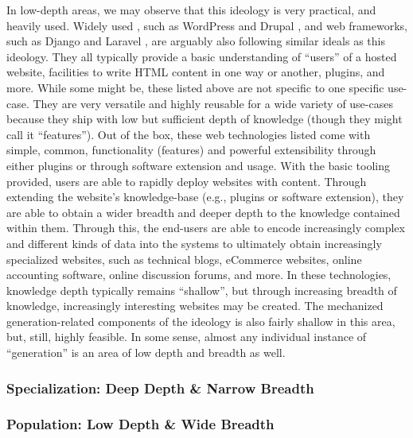 In low-depth areas, we may observe that this ideology is very practical, and
heavily used. Widely used , such as WordPress \cite{WordPress} and
Drupal \cite{Drupal}, and web frameworks, such as Django \cite{Django} and
Laravel \cite{Laravel}, are arguably also following similar ideals as this
ideology. They all typically provide a basic understanding of ``users'' of a
hosted website, facilities to write HTML content in one way or another, plugins,
and more. While some might be, these listed above are not specific to one
specific use-case. They are very versatile and highly reusable for a wide
variety of use-cases because they ship with low but sufficient depth of
knowledge (though they might call it ``features''). Out of the box, these web
technologies listed come with simple, common, functionality (features) and
powerful extensibility through either plugins or through software extension and
usage. With the basic tooling provided, users are able to rapidly deploy
websites with content. Through extending the website's knowledge-base (e.g.,
plugins or software extension), they are able to obtain a wider breadth and
deeper depth to the knowledge contained within them. Through this, the end-users
are able to encode increasingly complex and different kinds of data into the
systems to ultimately obtain increasingly specialized websites, such as
technical blogs, eCommerce websites, online accounting software, online
discussion forums, and more. In these technologies, knowledge depth typically
remains ``shallow'', but through increasing breadth of knowledge, increasingly
interesting websites may be created. The mechanized generation-related
components of the ideology is also fairly shallow in this area, but, still,
highly feasible. In some sense, almost any individual instance of ``generation''
is an area of low depth and breadth as well.

\subsubsection{Specialization: Deep Depth \& Narrow Breadth}
\label{chap:ideology:sec:thoughts_of_generation:subsec:feasibility:subsubsec:specialization}

\subsubsection{Population: Low Depth \& Wide Breadth}
\label{chap:ideology:sec:thoughts_of_generation:subsec:feasibility:subsubsec:modelling}

